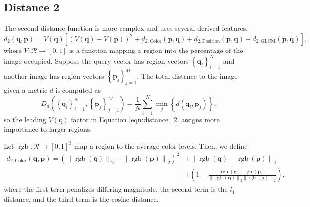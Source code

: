 \documentclass[letterpaper]{article}
\begin{document}
\subsection{Distance 2}

The second distance function is more complex and uses several derived features.
\begin{equation}
  d_2\left(\mathbf{q}, \mathbf{p}\right) = V(\mathbf{q})\left[\left(V(\mathbf{q}) - V(\mathbf{p})\right)^2 +
  d_{2,\text{Color}}\left(\mathbf{p}, \mathbf{q}\right) +
  d_{2,\text{Position}}\left(\mathbf{p}, \mathbf{q}\right) +
  d_{2,\text{GLCM}}\left(\mathbf{p}, \mathbf{q}\right)\right],
  \label{eqn:distance_2}
\end{equation}
where $V: \mathcal{R} \rightarrow [0, 1]$ is a function mapping a region into
the percentage of the image occupied. Suppose the query vector has region
vectors $\left\{\mathbf{q}_i\right\}_{i=1}^{N}$ and another image has region
vectors $\left\{\mathbf{p}_j\right\}_{j=1}^{M}$. The total distance to the image
given a metric $d$ is computed as
\begin{equation}
  D_d\left(\left\{\mathbf{q}_i\right\}_{i=1}^{N}, \left\{\mathbf{p}_j\right\}_{j=1}^{M}\right)
  = \frac{1}{N}\sum_{i=1}^N\min_{j}\left\{d\left(\mathbf{q}_i, \mathbf{p}_j\right)\right\},
  \label{eqn:total_distance}
\end{equation}
so the leading $V\left(\mathbf{q}\right)$ factor in Equation
\ref{eqn:distance_2} assigns more importance to larger regions.

Let $\operatorname{rgb}: \mathcal{R}\rightarrow \left[0, 1\right]^3$ map a
region to the average color levels. Then, we define
\begin{equation}
  \begin{split}
  d_{2,\text{Color}}\left(\mathbf{q}, \mathbf{p}\right) =
  \left(\left\lVert \operatorname{rgb}\left(\mathbf{q}\right)\right\rVert_2 -
    \left\lVert \operatorname{rgb}\left(\mathbf{p}\right)\right\rVert_2\right)^2
  &+ \left\lVert \operatorname{rgb}\left(\mathbf{q}\right) -
    \operatorname{rgb}\left(\mathbf{p}\right)
  \right\rVert_1 \\ &+
  \left(1 - \frac{\operatorname{rgb}\left(\mathbf{q}\right)\cdot\operatorname{rgb}\left(\mathbf{p}\right)}
    {\left\lVert \operatorname{rgb}\left(\mathbf{q}\right)\right\rVert_2\left\lVert \operatorname{rgb}\left(\mathbf{p}\right)\right\rVert_2}\right),
\end{split}
  \label{eqn:distance_2_color}  
\end{equation}
where the first term penalizes differing magnitude, the second term is the $l_1$
distance, and the third term is the cosine distance.
\end{document}

